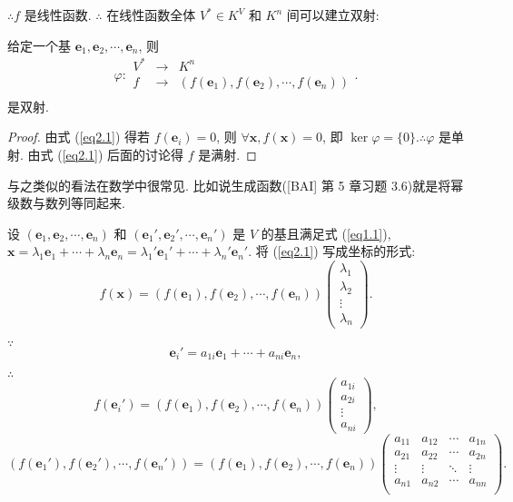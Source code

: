 \documentclass[color=black,device=normal,lang=cn,mode=geye]{elegantnote}
\begin{document}
$\therefore f$ 是线性函数. $\therefore$ 在线性函数全体 $V^*\in K^V$ 和 $K^n$ 间可以建立双射:
\begin{theorem}\label{t2.1}
    给定一个基 $\boldsymbol{e}_1,\boldsymbol{e}_2,\cdots,\boldsymbol{e}_n$, 则
    \[\varphi:\begin{array}{rcl}
        V^* & \to & K^n \\
        f & \to & (f(\boldsymbol{e}_1),f(\boldsymbol{e}_2),\cdots,f(\boldsymbol{e}_n)) \\
    \end{array}.\]
    是双射.
\end{theorem}
\begin{proof}
    由式 (\ref{eq2.1}) 得若 $f(\boldsymbol{e}_i)=0$, 则 $\forall\boldsymbol{x},f(\boldsymbol{x})=0$, 即 $\ker\varphi=\{0\}.\therefore\varphi$ 是单射. 由式 (\ref{eq2.1}) 后面的讨论得 $f$ 是满射. 
\end{proof}

与之类似的看法在数学中很常见. 比如说生成函数([BAI] 第 5 章习题 3.6)就是将幂级数与数列等同起来.

设 $(\boldsymbol{e}_1,\boldsymbol{e}_2,\cdots,\boldsymbol{e}_n)$ 和 $(\boldsymbol{e}_1',\boldsymbol{e}_2',\cdots,\boldsymbol{e}_n')$ 是 $V$ 的基且满足式 (\ref{eq1.1}), $\boldsymbol{x}=\lambda_1\boldsymbol{e}_1 +\cdots+\lambda_n\boldsymbol{e}_n=\lambda_1'\boldsymbol{e}_1'+\cdots+\lambda_n'\boldsymbol{e}_n'$. 将 (\ref{eq2.1}) 写成坐标的形式:
\[f(\boldsymbol{x})=(f(\boldsymbol{e}_1),f(\boldsymbol{e}_2),\cdots,f(\boldsymbol{e}_n))\begin{pmatrix}
    \lambda_1 \\
    \lambda_2 \\
    \vdots \\
    \lambda_n
\end{pmatrix}.\]

$\because$
\[\boldsymbol{e}_i'=a_{1i}\boldsymbol{e}_1+\cdots+a_{ni}\boldsymbol{e}_n,\]

$\therefore$
\[f(\boldsymbol{e}_i')=(f(\boldsymbol{e}_1),f(\boldsymbol{e}_2),\cdots,f(\boldsymbol{e}_n))\begin{pmatrix}
    a_{1i} \\
    a_{2i} \\
    \vdots \\
    a_{ni}
\end{pmatrix},\]
\[(f(\boldsymbol{e}_1'),f(\boldsymbol{e}_2'),\cdots,f(\boldsymbol{e}_n'))=(f(\boldsymbol{e}_1),f(\boldsymbol{e}_2),\cdots,f(\boldsymbol{e}_n))\begin{pmatrix}
    a_{11} & a_{12} & \cdots & a_{1n} \\
    a_{21} & a_{22} & \cdots & a_{2n} \\
    \vdots & \vdots & \ddots & \vdots \\
    a_{n1} & a_{n2} & \cdots & a_{nn} \\
\end{pmatrix}.\]
\end{document}
